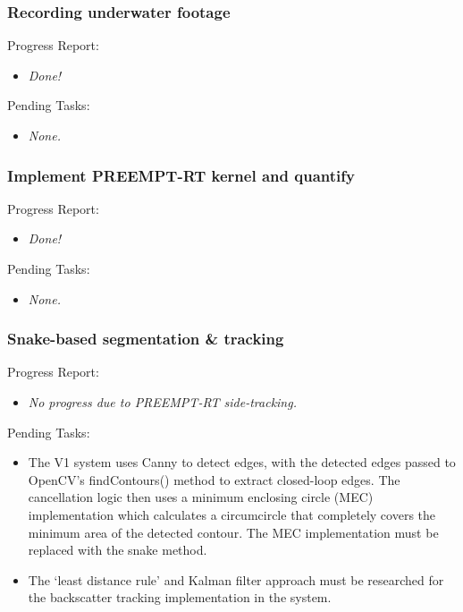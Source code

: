 \subsubsection{Recording underwater footage}

Progress Report:

\begin{itemize}
    \item \textit{Done!}
\end{itemize}

Pending Tasks:

\begin{itemize}
    \item \textit{None.}
\end{itemize}




\subsubsection{Implement PREEMPT-RT kernel and quantify}

Progress Report:

\begin{itemize}
    \item \textit{Done!}
\end{itemize}

Pending Tasks:

\begin{itemize}
    \item \textit{None.}
\end{itemize}






\subsubsection{Snake-based segmentation \& tracking}

Progress Report:

\begin{itemize}
    \item \textit{No progress due to PREEMPT-RT side-tracking.}
\end{itemize}

Pending Tasks:

\begin{itemize}
    \item The V1 system uses Canny to detect edges, with the detected edges passed to OpenCV's findContours() method to extract closed-loop edges. The cancellation logic then uses a minimum enclosing circle (MEC) implementation which calculates a circumcircle that completely covers the minimum area of the detected contour. The MEC implementation must be replaced with the snake method.
    \item The `least distance rule' and Kalman filter approach must be researched for the backscatter tracking implementation in the system.
\end{itemize}
